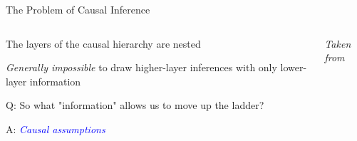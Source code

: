 \documentclass[notes,11pt, aspectratio=169, usenames, dvipsnames]{beamer}
\newenvironment{wideitemize}{\itemize\addtolength{\itemsep}{10pt}}{\enditemize}
\begin{document}
\begin{frame}{The Problem of Causal Inference}
	\begin{columns}[c] %
		\begin{column}{.58\textwidth}
			\begin{wideitemize}
				\item<1-> The layers of the causal hierarchy are nested
				\item<2-> \emph{Generally impossible} to draw higher-layer inferences with only lower-layer information \citep{BarenboimEtal2020}
				\item<3-> Q: So what "information" allows us to move up the ladder?
				\item<4-> A: \emph{\textcolor{blue}{Causal assumptions}}
			\end{wideitemize}
		\end{column}
		\hfill%
		\begin{column}{.38\textwidth}
			\vspace{0.5cm}%
			\raggedleft \footnotesize \emph{Taken from \citep[p. 6]{BarenboimEtal2020}}
		\end{column}%
	\end{columns}
\end{frame}
\end{document}
